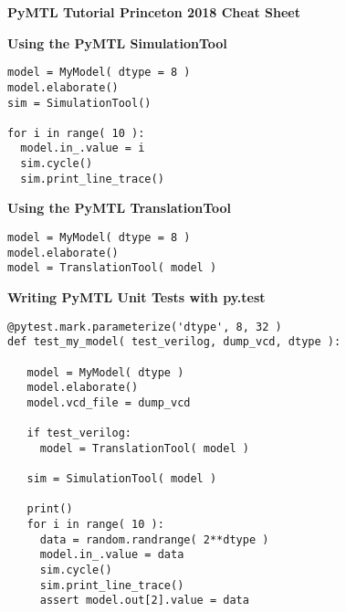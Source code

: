 \documentclass{cbxdoc}
\begin{document}
\begin{landscape}
\small

\begin{center}
  \textbf{\Large PyMTL
    Tutorial  \hspace{0.5em}\textbullet\hspace{0.5em}
    Princeton 2018 \hspace{0.5em}\textbullet\hspace{0.5em}
    Cheat Sheet}
\end{center}

\hfill
\begin{minipage}[t]{3.25in}
\vspace{0pt}

\colorbox{gray!30!white}{\parbox{1.025\tw}{\rule[-0.4em]{0pt}{1.4em}\centering\textbf{%
  Using the PyMTL SimulationTool%
}}}

\smallskip
\begin{lstlisting}[numbers={none},xleftmargin={0.1in}]
model = MyModel( dtype = 8 )
model.elaborate()
sim = SimulationTool()

for i in range( 10 ):
  model.in_.value = i
  sim.cycle()
  sim.print_line_trace()
\end{lstlisting}

\vspace{0.15in}
\colorbox{gray!30!white}{\parbox{1.025\tw}{\rule[-0.4em]{0pt}{1.4em}\centering\textbf{%
  Using the PyMTL TranslationTool%
}}}

\smallskip
\begin{lstlisting}[numbers={none},xleftmargin={0.1in}]
model = MyModel( dtype = 8 )
model.elaborate()
model = TranslationTool( model )
\end{lstlisting}

\vspace{0.15in}
\colorbox{gray!30!white}{\parbox{1.025\tw}{\rule[-0.4em]{0pt}{1.4em}\centering\textbf{%
  Writing PyMTL Unit Tests with py.test%
}}}

\smallskip
\begin{lstlisting}[numbers={none},xleftmargin={0.1in}]
@pytest.mark.parameterize('dtype', 8, 32 )
def test_my_model( test_verilog, dump_vcd, dtype ):

   model = MyModel( dtype )
   model.elaborate()
   model.vcd_file = dump_vcd

   if test_verilog:
     model = TranslationTool( model )

   sim = SimulationTool( model )

   print()
   for i in range( 10 ):
     data = random.randrange( 2**dtype )
     model.in_.value = data
     sim.cycle()
     sim.print_line_trace()
     assert model.out[2].value = data
\end{lstlisting}


\end{minipage}
\end{landscape}
\end{document}
